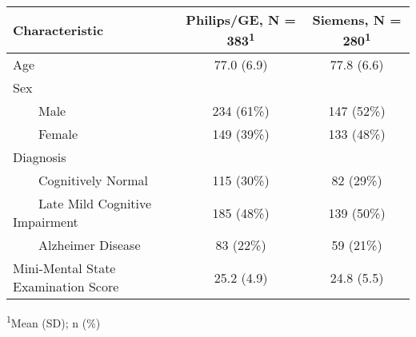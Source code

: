 \setlength{\LTpost}{0mm}
\begin{longtable}{lcc}
\toprule
\textbf{Characteristic} & \textbf{Philips/GE}, N = 383\textsuperscript{1} & \textbf{Siemens}, N = 280\textsuperscript{1} \\ 
\midrule
Age & 77.0 (6.9) & 77.8 (6.6) \\ 
Sex &  &  \\ 
    Male & 234 (61\%) & 147 (52\%) \\ 
    Female & 149 (39\%) & 133 (48\%) \\ 
Diagnosis &  &  \\ 
    Cognitively Normal & 115 (30\%) & 82 (29\%) \\ 
    Late Mild Cognitive Impairment & 185 (48\%) & 139 (50\%) \\ 
    Alzheimer Disease & 83 (22\%) & 59 (21\%) \\ 
Mini-Mental State Examination Score & 25.2 (4.9) & 24.8 (5.5) \\ 
\bottomrule
\end{longtable}
\begin{minipage}{\linewidth}
\textsuperscript{1}Mean (SD); n (\%)\\
\end{minipage}

